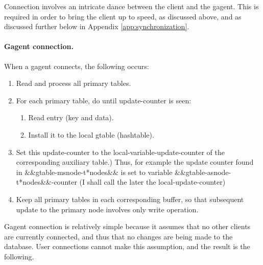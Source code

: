 Connection involves an intricate dance between the client and the gagent.
This is required in order to bring the client up to speed, as discussed
above, and as discussed further below in Appendix
\ref{app:synchronization}.

\paragraph{Gagent connection.}

When a gagent connects, the following occurs:
\begin{enumerate}
\item Read and process all primary tables.
\item For each primary table, do until update-counter is seen:
  \begin{enumerate}
    \item  Read entry (key and data).
    \item  Install it to the local gtable (hashtable).
  \end{enumerate}
  
\item Set this update-counter to the local-variable-update-counter of the
  corresponding auxiliary table.)  Thus, for example the update counter found
  in \&\&gtable-msnode-t*nodes\&\& is set to variable
  \&\&gtable-asnode-t*nodes\&\&-counter (I shall call the later the
  local-update-counter)
	
\item Keep all primary tables in each corresponding buffer, so that
  subsequent update to the primary node involves only write operation.
\end{enumerate}

Gagent connection is relatively simple because it assumes that no other
clients are currently connected, and thus that no changes are being made
to the database. User connections cannot make this assumption, and the
result is the following.

